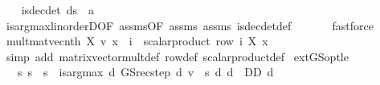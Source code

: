 \begin{isabellebody}
\isanewline
{}\isamarkupfalse%
\isanewline
\ \ \isamarkupfalse%
\ {\isachardoublequoteopen}is{\isacharunderscore}{\kern0pt}dec{\isacharunderscore}{\kern0pt}det\ {\isacharparenleft}{\kern0pt}d{\isacharparenleft}{\kern0pt}s\ {\isacharcolon}{\kern0pt}{\isacharequal}{\kern0pt}\ a{\isacharparenright}{\kern0pt}{\isacharparenright}{\kern0pt}{\isachardoublequoteclose}\isanewline
\ \ \ \ \isamarkupfalse%
\ is{\isacharunderscore}{\kern0pt}arg{\isacharunderscore}{\kern0pt}max{\isacharunderscore}{\kern0pt}linorderD{\isacharbrackleft}{\kern0pt}OF\ assms{\isacharparenleft}{\kern0pt}{}{\isacharparenright}{\kern0pt}{\isacharbrackleft}{\kern0pt}OF\ assms{\isacharparenleft}{\kern0pt}{}{\isacharparenright}{\kern0pt}{\isacharbrackright}{\kern0pt}{\isacharbrackright}{\kern0pt}\ assms{\isacharparenleft}{\kern0pt}{}{\isacharparenright}{\kern0pt}\ is{\isacharunderscore}{\kern0pt}dec{\isacharunderscore}{\kern0pt}det{\isacharunderscore}{\kern0pt}def\ \isanewline
\ \ \ \ \isamarkupfalse%
\ fastforce\isanewline
{}\isamarkupfalse%
%
\endisatagproof
{\isafoldproof}%
%
\isadelimproof
\isanewline
%
\endisadelimproof
\isanewline
{}\isamarkupfalse%
\ mult{\isacharunderscore}{\kern0pt}mat{\isacharunderscore}{\kern0pt}vec{\isacharunderscore}{\kern0pt}nth{\isacharcolon}{\kern0pt}\ {\isachardoublequoteopen}{\isacharparenleft}{\kern0pt}X\ {\isacharasterisk}{\kern0pt}v\ x{\isacharparenright}{\kern0pt}\ {\isachardollar}{\kern0pt}\ i\ {\isacharequal}{\kern0pt}\ scalar{\isacharunderscore}{\kern0pt}product\ {\isacharparenleft}{\kern0pt}row\ i\ X{\isacharparenright}{\kern0pt}\ x{\isachardoublequoteclose}\isanewline
%
\isadelimproof
\ \ %
\endisadelimproof
%
\isatagproof
{}\isamarkupfalse%
\ {\isacharparenleft}{\kern0pt}simp\ add{\isacharcolon}{\kern0pt}\ matrix{\isacharunderscore}{\kern0pt}vector{\isacharunderscore}{\kern0pt}mult{\isacharunderscore}{\kern0pt}def\ row{\isacharunderscore}{\kern0pt}def\ scalar{\isacharunderscore}{\kern0pt}product{\isacharunderscore}{\kern0pt}def{\isacharparenright}{\kern0pt}%
\endisatagproof
{\isafoldproof}%
%
\isadelimproof
\isanewline
%
\endisadelimproof
\isanewline
\isanewline
\isanewline
{}\isamarkupfalse%
\ ext{\isacharunderscore}{\kern0pt}GS{\isacharunderscore}{\kern0pt}opt{\isacharunderscore}{\kern0pt}le{\isacharcolon}{\kern0pt}\isanewline
\ \ \ {\isachardoublequoteopen}{\isacharparenleft}{\kern0pt}{\isasymAnd}s{\isacharprime}{\kern0pt}{\isachardot}{\kern0pt}\ s{\isacharprime}{\kern0pt}\ {\isacharless}{\kern0pt}\ s\ {\isasymLongrightarrow}\ is{\isacharunderscore}{\kern0pt}arg{\isacharunderscore}{\kern0pt}max\ {\isacharparenleft}{\kern0pt}{\isasymlambda}d{\isachardot}{\kern0pt}\ GS{\isacharunderscore}{\kern0pt}rec{\isacharunderscore}{\kern0pt}step\ d\ v\ {\isachardollar}{\kern0pt}\ s{\isacharprime}{\kern0pt}{\isacharparenright}{\kern0pt}\ {\isacharparenleft}{\kern0pt}{\isasymlambda}d{\isachardot}{\kern0pt}\ d\ {\isasymin}\ D\isactrlsub D{\isacharparenright}{\kern0pt}\ d{\isacharparenright}{\kern0pt}{\isachardoublequoteclose}\isanewline

\end{isabellebody}
